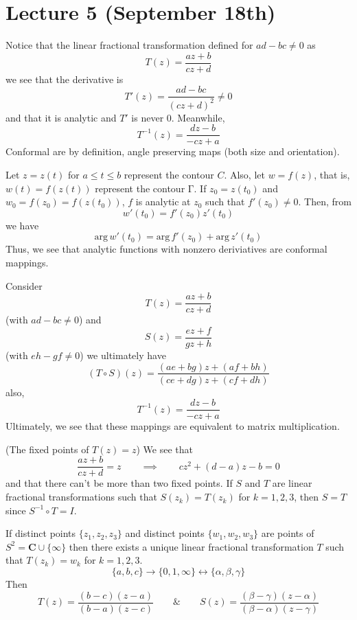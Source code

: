 \section{Lecture 5 (September 18th)}
\begin{defi}
Notice that the linear fractional transformation defined for $ad-bc\ne 0$ as
\[T(z)=\dfrac{az+b}{cz+d}\]
we see that the derivative is 
\[T'(z)=\dfrac{ad-bc}{(cz+d)^2}\ne 0\]
and that it is analytic and $T'$ is never 0. Meanwhile,
\[T^{-1}(z)=\dfrac{dz-b}{-cz+a}\]
Conformal are by definition, angle preserving maps (both size and orientation).
\end{defi}
\vspace{2ex}
\begin{defi}
Let $z=z(t)$ for $a\leq t\leq b$ represent the contour $C$. Also, let $w=f(z)$, that is, $w(t)=f(z(t))$ represent the contour $\mathrm{\Gamma} $. If $z_0=z(t_0)$ and $w_0=f(z_0)=f(z(t_0))$, $f$ is analytic at $z_0$ such that $f'(z_0)\ne 0$. Then, from \[w'(t_0)=f'(z_0)z'(t_0)\]
we have
\[\mathrm{arg}\,w'(t_0)=\mathrm{arg}\,f'(z_0)+\mathrm{arg}\,z'(t_0)\]
Thus, we see that analytic functions with nonzero deriviatives are conformal mappings.
\end{defi}
\vspace{2ex}
\begin{defi}
Consider
\[T(z)=\dfrac{az+b}{cz+d}\]
(with $ad-bc\ne 0$) and 
\[S(z)=\dfrac{ez+f}{gz+h}\]
(with $eh-gf\ne 0$) we ultimately have
\[(T \circ S)(z)=\dfrac{(ae+bg)z+(af+bh)}{(ce+dg)z+(cf+dh)}\]
also,
\[T^{-1}(z)=\dfrac{dz-b}{-cz+a}\]
Ultimately, we see that these mappings are equivalent to matrix multiplication. 
\end{defi}
\vspace{2ex}
\begin{prop}
(The fixed points of $T(z)=z$) We see that
\[\dfrac{az+b}{cz+d}=z\qquad \implies \qquad cz^2+(d-a)z-b=0\]
and that there can't be more than two fixed points. If $S$ and $T$ are linear fractional transformations such that $S(z_{k})=T(z_{k})$ for $k=1,2,3$, then $S=T$ since $S^{-1}\circ T=I$.
\end{prop}
\vspace{2ex}
\begin{thm}
If distinct points $\{z_1,z_2,z_3\}$ and distinct points $\{w_1,w_2,w_3\}$ are points of $S^2={\bm C}\cup \{\infty \}$ then there exists a unique linear fractional transformation $T$ such that $T(z_{k})=w_{k}$ for $k=1,2,3$.
\[\{a,b,c\}\rightarrow \{0,1,\infty \}\leftrightarrow \{\alpha ,\beta ,\gamma \}\]
Then
\[T(z)=\dfrac{(b-c)(z-a)}{(b-a)(z-c)}\qquad \&\qquad S(z)=\dfrac{(\beta -\gamma )(z-\alpha )}{(\beta -\alpha )(z-\gamma )}\]
\end{thm}
